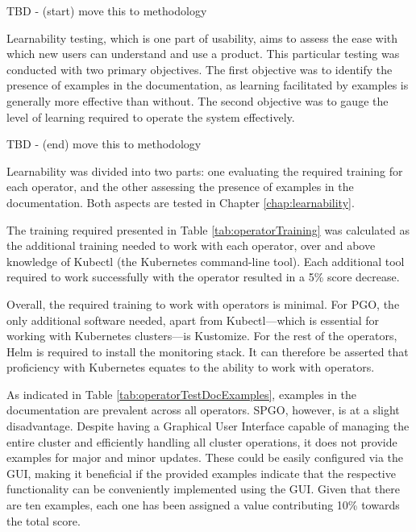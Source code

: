 TBD - (start) move this to methodology

Learnability testing, which is one part of usability, aims to assess the ease with which new users can understand and use a product. This particular testing was conducted with two primary objectives. The first objective was to identify the presence of examples in the documentation, as learning facilitated by examples is generally more effective than without. The second objective was to gauge the level of learning required to operate the system effectively.

TBD - (end) move this to methodology

Learnability was divided into two parts: one evaluating the required training for each operator, and the other assessing the presence of examples in the documentation.
Both aspects are tested in Chapter \ref{chap:learnability}.

The training required presented in Table \ref{tab:operatorTraining} was calculated as the additional training needed to work with each operator, over and above knowledge of Kubectl (the Kubernetes command-line tool).
Each additional tool required to work successfully with the operator resulted in a 5\% score decrease.

Overall, the required training to work with operators is minimal. For PGO, the only additional software needed, apart from Kubectl—which is essential for working with Kubernetes clusters—is Kustomize.
For the rest of the operators, Helm is required to install the monitoring stack. It can therefore be asserted that proficiency with Kubernetes equates to the ability to work with operators.


As indicated in Table \ref{tab:operatorTestDocExamples}, examples in the documentation are prevalent across all operators. SPGO, however, is at a slight disadvantage.
Despite having a Graphical User Interface capable of managing the entire cluster and efficiently handling all cluster operations, it does not provide examples for major and minor updates.
These could be easily configured via the GUI, making it beneficial if the provided examples indicate that the respective functionality can be conveniently implemented using the GUI.
Given that there are ten examples, each one has been assigned a value contributing 10\% towards the total score.


